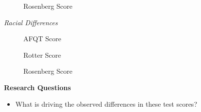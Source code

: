 \begin{frame}\begin{figure}[htp]\centering
\caption{Rosenberg Score}
\end{figure}\end{frame}
\begin{frame}\begin{center}
\LARGE\textit{Racial Differences}
\end{center}\end{frame}
\begin{frame}\begin{figure}[htp]\centering
\caption{AFQT Score}
\end{figure}\end{frame}
\begin{frame}\begin{figure}[htp]\centering
\caption{Rotter Score}
\end{figure}\end{frame}
\begin{frame}\begin{figure}[htp]\centering
\caption{Rosenberg Score}
\end{figure}\end{frame}
\begin{frame}\textbf{Research Questions}\vspace{0.3cm}
\begin{itemize}\setlength\itemsep{1em}
\item What is driving the observed differences in these test scores?
\end{itemize}
\end{frame}
